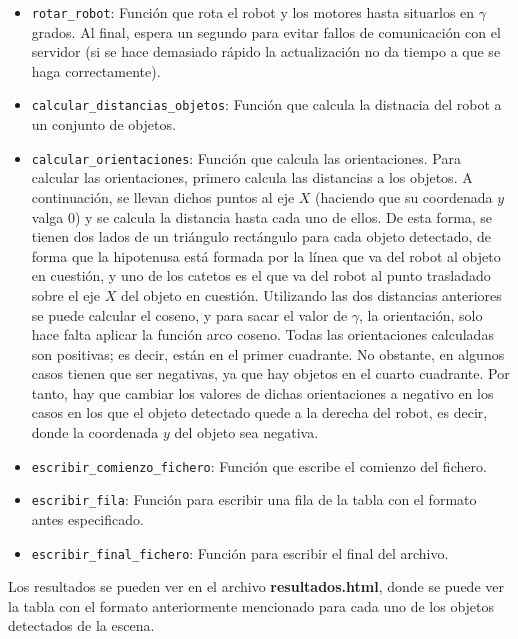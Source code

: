 \documentclass[11pt,a4paper]{article}
\begin{document}
\begin{itemize}[label=\textbullet]
	\item \texttt{rotar\_robot}: Función que rota el robot y los motores hasta situarlos
	en $\gamma$ grados. Al final, espera un segundo para evitar fallos de comunicación
	con el servidor (si se hace demasiado rápido la actualización no da tiempo a que se haga
	correctamente).
	\item \texttt{calcular\_distancias\_objetos}: Función que calcula la distnacia del robot
	a un conjunto de objetos.
	\item \texttt{calcular\_orientaciones}: Función que calcula las orientaciones. Para calcular
	las orientaciones, primero calcula las distancias a los objetos. A continuación, se llevan
	dichos puntos al eje $X$ (haciendo que su coordenada $y$ valga 0) y se calcula la distancia
	hasta cada uno de ellos. De esta forma, se tienen dos lados de un triángulo rectángulo para
	cada objeto detectado, de forma que la hipotenusa está formada por la línea que va del robot
	al objeto en cuestión, y uno de los catetos es el que va del robot al punto trasladado sobre
	el eje $X$ del objeto en cuestión. Utilizando las dos distancias anteriores se puede calcular
	el coseno, y para sacar el valor de $\gamma$, la orientación, solo hace falta aplicar la
	función arco coseno. Todas las orientaciones calculadas son positivas; es decir, están en el
	primer cuadrante. No obstante, en algunos casos tienen que ser negativas, ya que hay objetos
	en el cuarto cuadrante. Por tanto, hay que cambiar los valores de dichas orientaciones
	a negativo en los casos en los que el objeto detectado quede a la derecha del robot, es decir,
	donde la coordenada $y$ del objeto sea negativa.
	\item \texttt{escribir\_comienzo\_fichero}: Función que escribe el comienzo del fichero.
	\item \texttt{escribir\_fila}: Función para escribir una fila de la tabla con el formato
	antes especificado.
	\item \texttt{escribir\_final\_fichero}: Función para escribir el final del archivo.
\end{itemize}

Los resultados se pueden ver en el archivo \textbf{resultados.html}, donde se puede
ver la tabla con el formato anteriormente mencionado para cada uno de los objetos
detectados de la escena.
\end{document}
